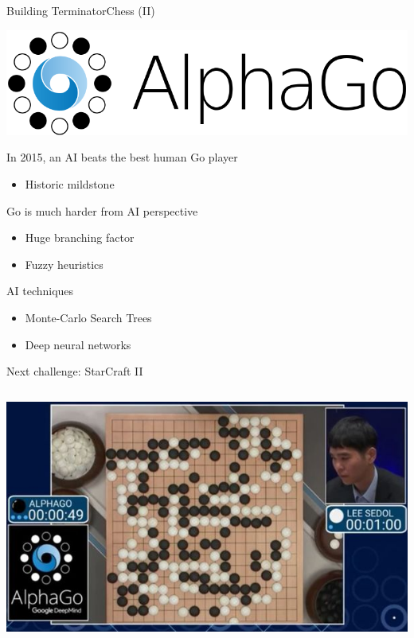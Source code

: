 \documentclass[10pt,compress]{beamer} %
\begin{document}
\begin{frame}{Building Terminator}{Chess (II)}
	\vspace{-2cm}

	\begin{center}
		\includegraphics[width=0.4\linewidth]{figs/alphago.png}
	\end{center}

	\vspace{-0.2cm}
	In 2015, an AI beats the best human Go player
	\begin{itemize}
		\item Historic mildstone
	\end{itemize}
	Go is much harder from AI perspective
	\begin{itemize}
		\item Huge branching factor
		\item Fuzzy heuristics
	\end{itemize}
	AI techniques
	\begin{itemize}
		\item Monte-Carlo Search Trees
		\item Deep neural networks
	\end{itemize}
	Next challenge: StarCraft II

	\vspace{-4cm}
	\begin{columns}
		\includegraphics[width=\linewidth]{figs/leesedol.jpg}
	\end{columns}
\end{frame}
\end{document}

